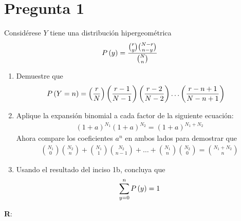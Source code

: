 
\section*{Pregunta 1}

Considérese $Y$ tiene una distribución hipergeométrica
\begin{align*}
	& {P} \left( {y} \right) = \frac{\binom{r}{y} \binom{N-r}{n-y}}{\binom{N}{n}}
\end{align*}
\begin{enumerate}[label=\alph*)]
	\item{
		Demuestre que
		\begin{align*}
		& {P} \left( {Y = n} \right) = \left( \frac{r}{N} \right) \left( \frac{r-1}{N-1} \right) \left( \frac{r-2}{N-2} \right) \ldots \left( \frac{r-n+1}{N-n+1} \right)
		\end{align*}		
	}
	
	\item{
		Aplique la expansión binomial a cada factor de la siguiente ecuación:
		\begin{align*}
		\left( 1 + a \right)^{N_1} \left( 1 + a \right)^{N_2} = \left( 1 + a \right)^{N_1 + N_2}
		\end{align*}
		Ahora compare los coeficientes $a^n$ en ambos lados para demostrar que
		\begin{align*}
		\binom{N_1}{0}\binom{N_2}{n} + \binom{N_1}{1} \binom{N_2}{n-1} + \ldots + \binom{N_1}{n} \binom{N_2}{0} = \binom{N_1 + N_2}{n}
		\end{align*}
	}
	
	\item{
		Usando el resultado del inciso 1b, concluya que
		\begin{align*}
			\sum_{y=0}^{n} {P} \left( {y} \right) = 1
		\end{align*}
	}
\end{enumerate}

\newpage
\textbf{R}: 

